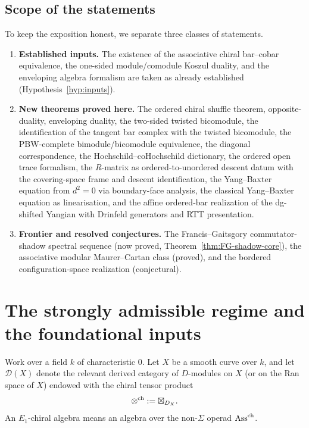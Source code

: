 \subsection*{Scope of the statements}
To keep the exposition honest, we separate three classes of statements.

\begin{enumerate}[label=(\roman*)]
\item \textbf{Established inputs.}
The existence of the associative chiral bar--cobar equivalence, the one-sided module/comodule
Koszul duality, and the enveloping algebra formalism are taken as already established
(Hypothesis~\ref{hyp:inputs}).

\item \textbf{New theorems proved here.}
The ordered chiral shuffle theorem, opposite-duality, enveloping duality, the two-sided twisted
bicomodule, the identification of the tangent bar complex with the twisted bicomodule, the PBW-complete
bimodule/bicomodule equivalence, the diagonal correspondence, the Hochschild--coHochschild
dictionary, the ordered open trace formalism, the $R$-matrix as
ordered-to-unordered descent datum with the covering-space frame and descent identification,
the Yang--Baxter equation from $d^2=0$ via boundary-face analysis, the classical
Yang--Baxter equation as linearisation, and the affine ordered-bar
realization of the dg-shifted Yangian with Drinfeld generators and
RTT presentation.

\item \textbf{Frontier and resolved conjectures.}
The Francis--Gaitsgory commutator-shadow spectral sequence (now proved,
Theorem~\ref{thm:FG-shadow-core}), the associative modular Maurer--Cartan
class (proved), and the bordered configuration-space realization (conjectural).
\end{enumerate}

\section{The strongly admissible regime and the foundational inputs}

Work over a field $k$ of characteristic $0$. Let $X$ be a smooth curve over $k$, and let
$\mathcal D(X)$ denote the relevant derived category of $D$-modules on $X$ (or on the Ran space of
$X$) endowed with the chiral tensor product
\[
\mathbin{\otimes^{\mathrm{ch}}} := \boxtimes_{D_X}.
\]
An $E_1$-chiral algebra means an algebra over the non-$\Sigma$ operad $\mathrm{Ass}^{\mathrm{ch}}$.

